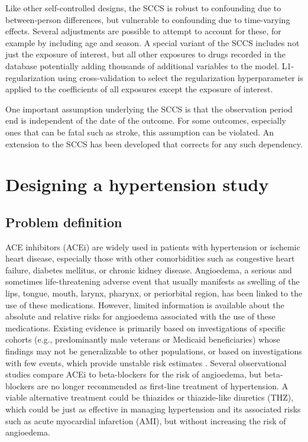 \documentclass[11pt]{book}
\theoremstyle{definition}
\theoremstyle{definition}
\theoremstyle{definition}
\theoremstyle{remark}
\begin{document}
Like other self-controlled designs, the SCCS is robust to confounding due to between-person differences, but vulnerable to confounding due to time-varying effects. Several adjustments are possible to attempt to account for these, for example by including age and season. A special variant of the SCCS includes not just the exposure of interest, but all other exposures to drugs recorded in the database \citep{simpson_2013} potentially adding thousands of additional variables to the model. L1-regularization using cross-validation to select the regularization hyperparameter is applied to the coefficients of all exposures except the exposure of interest.

One important assumption underlying the SCCS is that the observation period end is independent of the date of the outcome. For some outcomes, especially ones that can be fatal such as stroke, this assumption can be violated. An extension to the SCCS has been developed that corrects for any such dependency. \citep{farrington_2011}

\hypertarget{designing-a-hypertension-study}{%
\section{Designing a hypertension study}\label{designing-a-hypertension-study}}

\hypertarget{problem-definition-1}{%
\subsection{Problem definition}\label{problem-definition-1}}

ACE inhibitors (ACEi) are widely used in patients with hypertension or ischemic heart disease, especially those with other comorbidities such as congestive heart failure, diabetes mellitus, or chronic kidney disease. \citep{zaman_2002} Angioedema, a serious and sometimes life-threatening adverse event that usually manifests as swelling of the lips, tongue, mouth, larynx, pharynx, or periorbital region, has been linked to the use of these medications. \citep{sabroe_1997} However, limited information is available about the absolute and relative risks for angioedema associated with the use of these medications. Existing evidence is primarily based on investigations of specific cohorts (e.g., predominantly male veterans or Medicaid beneficiaries) whose findings may not be generalizable to other populations, or based on investigations with few events, which provide unstable risk estimates \citep{powers_2012}. Several observational studies compare ACEi to beta-blockers for the risk of angioedema, \citep{magid_2010, toh_2012} but beta-blockers are no longer recommended as first-line treatment of hypertension. \citep{whelton_2018} A viable alternative treatment could be thiazides or thiazide-like diuretics (THZ), which could be just as effective in managing hypertension and its associated risks such as acute myocardial infarction (AMI), but without increasing the risk of angioedema.
\end{document}

